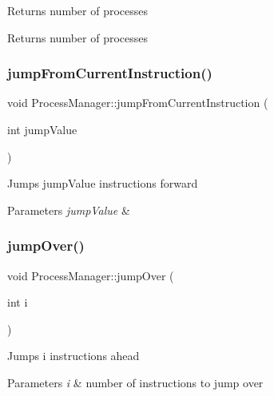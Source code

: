 Returns number of processes \begin{DoxyReturn}{Returns}
number of processes 
\end{DoxyReturn}
\mbox{\label{classProcessManager_a2aaeb45b6e1a58e86856899d925c2c7f}} 
\subsubsection{\texorpdfstring{jump\+From\+Current\+Instruction()}{jumpFromCurrentInstruction()}}
{\footnotesize\ttfamily void Process\+Manager\+::jump\+From\+Current\+Instruction (\begin{DoxyParamCaption}\item[{int}]{jump\+Value }\end{DoxyParamCaption})}

Jumps jump\+Value instructions forward 
\begin{DoxyParams}{Parameters}
{\em jump\+Value} & \\
\hline
\end{DoxyParams}
\mbox{\label{classProcessManager_a3a526dfc1413064125c163e58411070d}} 
\subsubsection{\texorpdfstring{jump\+Over()}{jumpOver()}}
{\footnotesize\ttfamily void Process\+Manager\+::jump\+Over (\begin{DoxyParamCaption}\item[{int}]{i }\end{DoxyParamCaption})}

Jumps i instructions ahead 
\begin{DoxyParams}{Parameters}
{\em i} & number of instructions to jump over \\
\hline
\end{DoxyParams}
\mbox{\label{classProcessManager_ad1050286f389fc52063ac4fb29fa8020}} 
